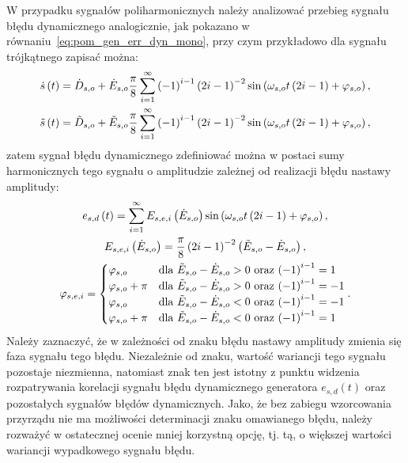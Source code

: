 W przypadku sygnałów poliharmonicznych należy analizować przebieg sygnału błędu dynamicznego analogicznie, jak pokazano w równaniu~\eqref{eq:pom_gen_err_dyn_mono}, przy czym przykładowo dla sygnału trójkątnego zapisać można:
\begin{gather}
\dot{s} \left(t\right) = \dot{D}_{s,o} + \dot{E}_{s,o} \frac{\pi}{8} \sum _{i=1} ^{\infty} \left(-1\right)^{i-1} \left(2i - 1\right)^{-2} \sin \left(\omega_{s,o} t \left(2i - 1\right) + \varphi_{s,o}\right) \label{eq:pom_gen_triangle_ideal}, \\
\tilde{s} \left(t\right) = \tilde{D}_{s,o} + \tilde{E}_{s,o} \frac{\pi}{8} \sum _{i=1} ^{\infty} \left(-1\right)^{i-1} \left(2i - 1\right)^{-2} \sin \left(\omega_{s,o} t \left(2i - 1\right) + \varphi_{s,o}\right) \label{eq:pom_gen_triangle_real},
\end{gather}
zatem sygnał błędu dynamicznego zdefiniować można w postaci sumy harmonicznych tego sygnału o amplitudzie zależnej od realizacji błędu nastawy amplitudy:
\begin{gather}
e_{s,d} \emb{t} = \sum _{i=1} ^{\infty} E_{s,e,i} \emb{\dot{E}_{s,o}} \sin \emb{\omega_{s,o} t \emb{2i - 1} + \varphi_{s,o}} \label{eq:pom_gen_err_dyn_triangle}, \\
E_{s,e,i} \emb{\dot{E}_{s,o}} = \frac{\pi}{8} \emb{2i - 1}^{-2} \emb{\tilde{E}_{s,o} - \dot{E}_{s,o}} \label{eq:pom_gen_err_amp_triangle}, \\
\varphi_{s,e,i} = 
\begin{cases}
\varphi_{s,o}       & $dla $ \tilde{E}_{s,o} - \dot{E}_{s,o} > 0 $ oraz $ \emb{-1}^{i-1} =  1 \\
\varphi_{s,o} + \pi & $dla $ \tilde{E}_{s,o} - \dot{E}_{s,o} > 0 $ oraz $ \emb{-1}^{i-1} = -1 \\
\varphi_{s,o}       & $dla $ \tilde{E}_{s,o} - \dot{E}_{s,o} < 0 $ oraz $ \emb{-1}^{i-1} = -1 \\
\varphi_{s,o} + \pi & $dla $ \tilde{E}_{s,o} - \dot{E}_{s,o} < 0 $ oraz $ \emb{-1}^{i-1} =  1
\end{cases}
\label{eq:pom_gen_err_phi_triangle}.
\end{gather}
Należy zaznaczyć, że w zależności od znaku błędu nastawy amplitudy zmienia się faza sygnału tego błędu. Niezależnie od znaku, wartość wariancji tego sygnału pozostaje niezmienna, natomiast znak ten jest istotny z punktu widzenia rozpatrywania korelacji sygnału błędu dynamicznego generatora $e_{s,d}(t)$ oraz pozostałych sygnałów błędów dynamicznych. Jako, że bez zabiegu wzorcowania przyrządu nie ma możliwości determinacji znaku omawianego błędu, należy rozważyć w ostatecznej ocenie mniej korzystną opcję, tj. tą, o większej wartości wariancji wypadkowego sygnału błędu.

